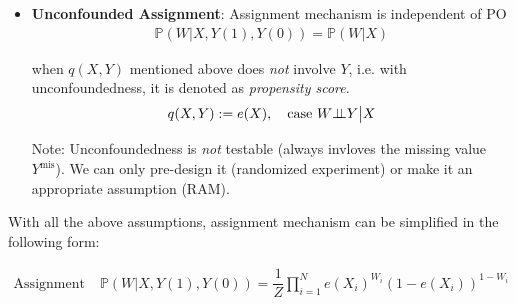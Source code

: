 \begin{itemize}[topsep=2pt,itemsep=0pt]
\begin{itemize}[topsep=2pt,itemsep=0pt]
        \item \textbf{Unconfounded Assignment}: Assignment mechanism is independent of PO
        \begin{align}
            \mathbb{P}(W|X,Y(1),Y(0))=\mathbb{P}(W|X)
        \end{align}

        when $ q(X,Y) $ mentioned above does \textit{not} involve $ Y $, i.e. with unconfoundedness, it is denoted as \textit{propensity score}.
        \begin{align*}
            q(X,Y) := e(X),\quad \text{case } W\bot\!\!\!\bot Y\big| X
        \end{align*}

        Note: Unconfoundedness is \textit{not} testable (always invloves the missing value $ Y^\mathrm{mis}  $). We can only pre-design it (randomized experiment) or make it an appropriate assumption (RAM).
    \end{itemize}
\end{itemize}


    
\begin{point}
    With all the above assumptions, assignment mechanism can be simplified in the following form:
\end{point}

\begin{align}
    \text{Assignment Mechanism:}\,&\mathbb{P}(W|X,Y(1),Y(0))=\dfrac{1}{Z}\prod_{i=1}^N e(X_i)^{W_i}(1-e(X_i))^{1-W_i}\\
\end{align}





